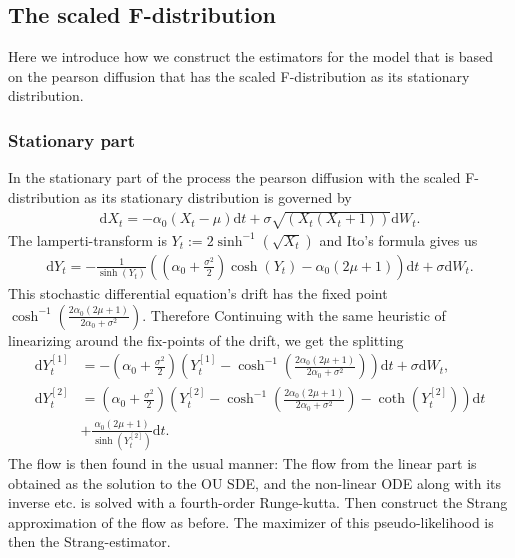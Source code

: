 \subsection{The scaled F-distribution}
Here we introduce how we construct the estimators for the model that is based on the pearson diffusion that has the scaled F-distribution as its stationary distribution. 
\subsubsection{Stationary part}
In the stationary part of the process the pearson diffusion with the scaled F-distribution as its stationary distribution is governed by
\begin{align}
    \mathrm{d}X_t = -\alpha_0\left(X_t - \mu\right)\mathrm{d}t + \sigma \sqrt{\left(X_t\left(X_t + 1\right)\right)}\mathrm{d}W_t.
\end{align}
The lamperti-transform is $Y_t := 2 \sinh^{-1}\left(\sqrt{X_t}\right)$ and Ito's formula gives us
\begin{align}
    \mathrm{d}Y_t = - \frac{1}{\sinh(Y_t)}\left(\left(\alpha_0 + \frac{\sigma^2}{2}\right)\cosh(Y_t) - \alpha_0\left(2\mu + 1\right)\right) \mathrm{d}t + \sigma \mathrm{d}W_t. \label{eq:F_diffusion_lamperti_SDE}
\end{align}
This stochastic differential equation's drift has the fixed point $\cosh^{-1}\left(\frac{2\alpha_0\left(2\mu + 1\right)}{2\alpha_0 + \sigma^2}\right)$.
Therefore Continuing with the same heuristic of linearizing around the fix-points of the drift, we get the splitting
\begin{align}
    \mathrm{d}Y_t^{[1]} &= -\left(\alpha_0 + \frac{\sigma^2}{2}\right)\left(Y_t^{[1]} - \cosh^{-1}\left(\frac{2\alpha_0\left(2\mu + 1\right)}{2\alpha_0 + \sigma^2}\right)\right)\mathrm{d}t + \sigma \mathrm{d}W_t, \\
    \mathrm{d}Y_t^{[2]} &= \left(\alpha_0 + \frac{\sigma^2}{2}\right) \left(Y_t^{[2]} - \cosh^{-1}\left(\frac{2\alpha_0\left(2\mu + 1\right)}{2\alpha_0 + \sigma^2}\right) - \coth\left(Y_t^{[2]}\right) \right)\mathrm{d}t\nonumber\\
    &+ \frac{\alpha_0\left(2\mu + 1\right)}{\sinh(Y_t^{[2]})}\mathrm{d}t. \label{eq:scaledFStrang}
\end{align}
The flow is then found in the usual manner: The flow from the linear part is obtained as the solution to the OU SDE, and the non-linear ODE along with its inverse etc. is solved with a fourth-order Runge-kutta. Then construct the Strang approximation of the flow as before. The maximizer of this pseudo-likelihood is then the Strang-estimator.  
